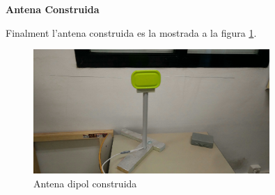 

\textbf{Antena Construida}

Finalment l'antena construida es la mostrada a la figura \ref{AntenaFinal}.

\begin{figure}[H]
\centering
\includegraphics[width=0.8\textwidth]{./images/Antena_final}
\caption{Antena dipol construida}
\label{AntenaFinal}
\end{figure}